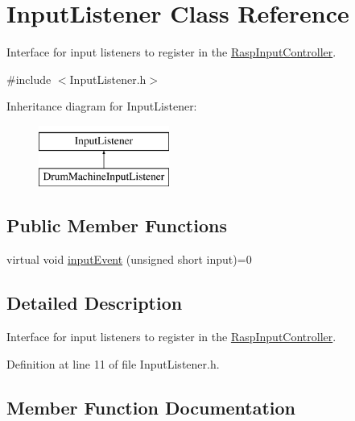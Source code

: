 \hypertarget{class_input_listener}{}\section{Input\+Listener Class Reference}
\label{class_input_listener}


Interface for input listeners to register in the \hyperlink{class_rasp_input_controller}{Rasp\+Input\+Controller}.  




{\ttfamily \#include $<$Input\+Listener.\+h$>$}

Inheritance diagram for Input\+Listener\+:\begin{figure}[H]
\begin{center}
\leavevmode
\includegraphics[height=2.000000cm]{class_input_listener}
\end{center}
\end{figure}
\subsection*{Public Member Functions}
\begin{DoxyCompactItemize}
\item 
virtual void \hyperlink{class_input_listener_a1a3d74f2ffc108c773511ea4be250f7d}{input\+Event} (unsigned short input)=0
\end{DoxyCompactItemize}


\subsection{Detailed Description}
Interface for input listeners to register in the \hyperlink{class_rasp_input_controller}{Rasp\+Input\+Controller}. 

Definition at line 11 of file Input\+Listener.\+h.



\subsection{Member Function Documentation}
\mbox{\label{class_input_listener_a1a3d74f2ffc108c773511ea4be250f7d}} 
